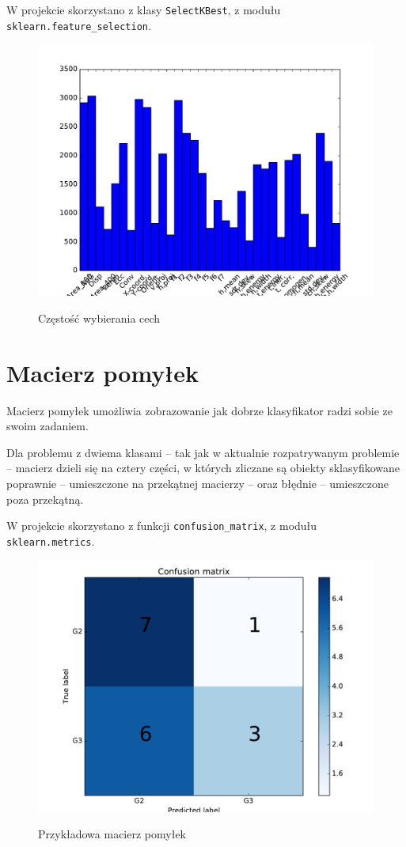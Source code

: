 W projekcie skorzystano z klasy \texttt{SelectKBest}, z modułu \texttt{sklearn.feature\_selection}.
\begin{figure}[h!]
	\centering
	\includegraphics[width=1.0\linewidth]{img/features.pdf}
	\label{Rysunek}
	\caption{Częstość wybierania cech}
\end{figure}

\newpage

\section{Macierz pomyłek}
Macierz pomyłek umożliwia zobrazowanie jak dobrze klasyfikator radzi sobie ze swoim zadaniem.

Dla problemu z dwiema klasami -- tak jak w aktualnie rozpatrywanym problemie -- macierz dzieli się na cztery części, w których zliczane są obiekty sklasyfikowane poprawnie -- umieszczone na przekątnej macierzy -- oraz błędnie -- umieszczone poza przekątną.

W projekcie skorzystano z funkcji \texttt{confusion\_matrix}, z modułu \texttt{sklearn.metrics}.
\begin{figure}[h!]
	\centering
	\includegraphics[width=0.8\linewidth]{img/conf_matrix.pdf}
	\label{Rysunek}
	\caption{Przykładowa macierz pomyłek}
\end{figure}